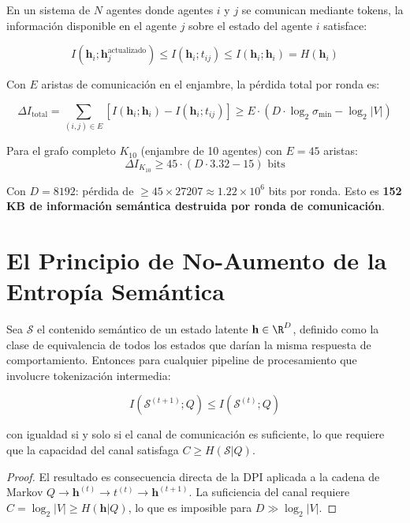 En un sistema de $N$ agentes donde agentes $i$ y $j$ se comunican mediante
tokens, la información disponible en el agente $j$ sobre el estado del agente $i$
satisface:

\begin{equation}
I(\mathbf{h}_i; \mathbf{h}_j^{\text{actualizado}}) \le I(\mathbf{h}_i; t_{ij}) \le I(\mathbf{h}_i; \mathbf{h}_i) = H(\mathbf{h}_i)
\end{equation}

Con $E$ aristas de comunicación en el enjambre, la pérdida total por ronda es:

\begin{equation}
\Delta I_{\text{total}} = \sum_{(i,j) \in E} \left[I(\mathbf{h}_i; \mathbf{h}_i) - I(\mathbf{h}_i; t_{ij})\right]
\ge E \cdot (D \cdot \log_2 \sigma_{\min} - \log_2 |V|)
\end{equation}

Para el grafo completo $K_{10}$ (enjambre de 10 agentes) con $E = 45$ aristas:
\begin{equation}
\Delta I_{K_{10}} \ge 45 \cdot (D \cdot 3.32 - 15) \text{ bits}
\end{equation}

Con $D = 8192$: pérdida de $\ge 45 \times 27207 \approx 1.22 \times 10^6$ bits por ronda.
Esto es \textbf{152 KB de información semántica destruida por ronda de comunicación}.

\section{El Principio de No-Aumento de la Entropía Semántica}

\begin{theorem}
\label{thm:no_aumento}
Sea $\mathcal{S}$ el contenido semántico de un estado latente $\mathbf{h} \in \R^D$,
definido como la clase de equivalencia de todos los estados que darían la misma
respuesta de comportamiento. Entonces para cualquier pipeline de procesamiento
que involucre tokenización intermedia:

\begin{equation}
I(\mathcal{S}^{(t+1)}; Q) \le I(\mathcal{S}^{(t)}; Q)
\end{equation}

con igualdad si y solo si el canal de comunicación es suficiente, lo que requiere
que la capacidad del canal satisfaga $C \ge H(\mathcal{S} | Q)$.
\end{theorem}

\begin{proof}
El resultado es consecuencia directa de la DPI aplicada a la cadena de Markov
$Q \to \mathbf{h}^{(t)} \to t^{(t)} \to \mathbf{h}^{(t+1)}$. La suficiencia
del canal requiere $C = \log_2|V| \ge H(\mathbf{h}|Q)$, lo que es imposible
para $D \gg \log_2|V|$.
\end{proof}

